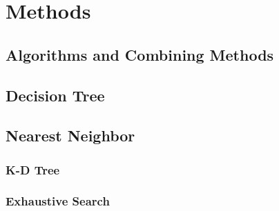 \section{Methods}
	\subsection{Algorithms and Combining Methods}
		
	\subsection{Decision Tree}
	\subsection{Nearest Neighbor}
		\subsubsection{K-D Tree}
		\subsubsection{Exhaustive Search}

